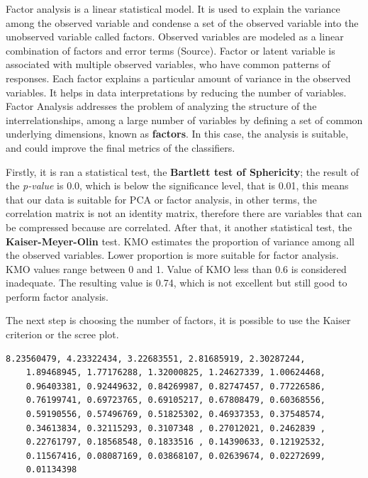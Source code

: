 Factor analysis is a linear statistical model. It is used to explain the variance among the observed variable and condense a set of the observed variable into the unobserved variable called factors. Observed variables are modeled as a linear combination of factors and error terms (Source). Factor or latent variable is associated with multiple observed variables, who have common patterns of responses. Each factor explains a particular amount of variance in the observed variables. It helps in data interpretations by reducing the number of variables.
Factor Analysis addresses the problem of analyzing the structure of the interrelationships, among a large number of variables by defining a set of common underlying dimensions, known as \textbf{factors}. In this case, the analysis is suitable, and could improve the final metrics of the classifiers.

Firstly, it is ran a statistical test, the \textbf{Bartlett test of Sphericity}; the result of the \textit{p-value} is 0.0, which is below the significance level, that is 0.01, this means that our data is suitable for PCA or factor analysis, in other terms, the correlation matrix is not an identity matrix, therefore there are variables that can be compressed because are correlated.
After that, it another statistical test, the \textbf{Kaiser-Meyer-Olin} test. KMO estimates the proportion of variance among all the observed variables. Lower proportion is more suitable for factor analysis. KMO values range between 0 and 1. Value of KMO less than 0.6 is considered inadequate. The resulting value is 0.74, which is not excellent but still good to perform factor analysis.

The next step is choosing the number of factors, it is possible to use the Kaiser criterion or the scree plot.

\begin{lstlisting}[caption=Eigenvalues vector, label=lst:eig, numbers=none]
    8.23560479, 4.23322434, 3.22683551, 2.81685919, 2.30287244,
    1.89468945, 1.77176288, 1.32000825, 1.24627339, 1.00624468,
    0.96403381, 0.92449632, 0.84269987, 0.82747457, 0.77226586,
    0.76199741, 0.69723765, 0.69105217, 0.67808479, 0.60368556,
    0.59190556, 0.57496769, 0.51825302, 0.46937353, 0.37548574,
    0.34613834, 0.32115293, 0.3107348 , 0.27012021, 0.2462839 ,
    0.22761797, 0.18568548, 0.1833516 , 0.14390633, 0.12192532,
    0.11567416, 0.08087169, 0.03868107, 0.02639674, 0.02272699,
    0.01134398
\end{lstlisting}

